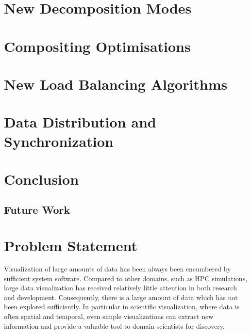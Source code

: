 \section{New Decomposition Modes}


\section{Compositing Optimisations}


\section{New Load Balancing Algorithms}


\section{Data Distribution and Synchronization}


\section{Conclusion}

\subsection{Future Work}




\section{Problem Statement}

Visualization of large amounts of data has been always been encumbered by
sufficient system software. Compared to other domains, such as HPC simulations,
large data visualization has received relatively little attention in both
research and development. Consequently, there is a large amount of data which
has not been explored sufficiently. In particular in scientific visualization,
where data is often spatial and temporal, even simple visualizations can extract
new information and provide a valuable tool to domain scientists for discovery.

